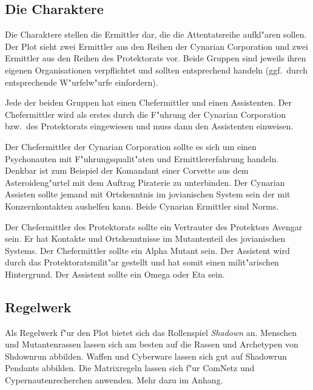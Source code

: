 \subsection{Die Charaktere}

Die Charaktere stellen die Ermittler dar, die die Attentatsreihe aufkl"aren sollen. Der Plot sieht zwei Ermittler aus den Reihen der Cynarian Corporation und zwei Ermittler aus den Reihen des Protektorats vor. Beide Gruppen sind jeweils ihren eigenen Organisationen verpflichtet und sollten entsprechend handeln (ggf.~durch entsprechende W"urfelw"urfe einfordern).

Jede der beiden Gruppen hat einen Chefermittler und einen Assistenten. Der Chefermittler wird als erstes durch die F"uhrung der Cynarian Corporation bzw.~des Protektorats eingewiesen und muss dann den Assistenten einweisen.

Der Chefermittler der Cynarian Corporation sollte es sich um einen Psychonauten mit F"uhrungsqualit"aten und Ermittlererfahrung handeln. Denkbar ist zum Beispiel der Komandant einer Corvette aus dem Asteroideng"urtel mit dem Auftrag Piraterie zu unterbinden. Der Cynarian Assisten sollte jemand mit Ortskenntnis im jovianischen System sein der mit Konzernkontakten aushelfen kann. Beide Cynarian Ermittler sind Norms.

Der Chefermittler des Protektorats sollte ein Vertrauter des Protektors Avengar sein. Er hat Kontakte und Ortskenntnisse im Mutantenteil des jovianischen Systems. Der Chefermittler sollte ein Alpha Mutant sein. Der Assistent wird durch das Protektoratsmilit"ar gestellt und hat somit einen milit"arischen Hintergrund. Der Assistent sollte ein Omega oder Eta sein.

\subsection{Regelwerk}

Als Regelwerk f"ur den Plot bietet sich das Rollenspiel \emph{Shadown} an. Menschen und Mutantenrassen lassen sich am besten auf die Rassen und Archetypen von Shdownrun abbilden. Waffen und Cyberware lassen sich gut auf Shadowrun Pendants abbilden. Die Matrixregeln lassen sich f"ur ComNetz und Cypernautenrecherchen anwenden. Mehr dazu im Anhang.
